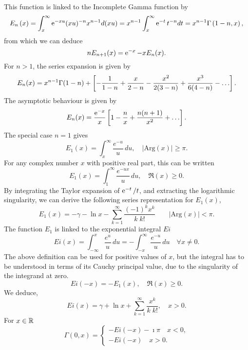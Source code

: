 This function is linked to the Incomplete Gamma function by 
\begin{equation*}
  E_n\left( x \right)=\int_{x}^{\infty}
  \operatorname{e}^{ -xu } (xu)^{-n} x^{n-1} d(xu)=x^{n-1} \int_{x}^{\infty}
  \operatorname{e}^{ -t } t^{-n} dt =  x^{n-1}  \Gamma\left( 1-n, x \right), 
\end{equation*}
from which we can deduce
\begin{equation*}
  n E_{n+1}(x)  =   \operatorname{e}^{ -x } - x E_n(x).
\end{equation*}
For $n>1$, the series expansion is given by
\begin{equation*}
  E_n(x)=x^{n-1}
  \Gamma(1-n)+\recaco{-\frac{1}{1-n}+\frac{x}{2-n}-\frac{x^2}{2(3-n)}
    +\frac{x^3}{6(4-n)}-\dots}.     
\end{equation*}
The asymptotic behaviour is given by
\begin{equation*}
  E_n(x)=\frac{\expp{-x}}{x}\recaco{1-\frac{n}{x}+\frac{n(n+1)}{x^2}+\dots}. 
\end{equation*}
The special case $n=1$ gives 
\begin{equation*}
  E_1(x) = \int_x^\infty \frac{e^{-u}}{u}\, du, \quad |\mathrm{Arg}(x)| \ge \pi. 
\end{equation*}
For any complex number $x$ with positive real part, this can be written
\begin{equation*}
  E_1(x) = \int_1^\infty \frac{e^{-ux}}{u}\, du, \quad \Re(x) \ge 0. 
\end{equation*}
By integrating the Taylor expansion of $\operatorname{e}^{ -t }/t$, and extracting the
logarithmic singularity, we can derive the following series representation for
$E_1(x)$, 
\begin{equation*}
  {E_1}(x) =-\gamma-\ln x-\sum_{k=1}^{\infty}\frac{(-1)^k x^k}{k\; k!}
  \qquad |\mathrm{Arg}(x)| < \pi. 
\end{equation*}
The function $E_1$ is linked to the exponential integral $Ei$
\begin{equation*}
  Ei(x)=\int_{-\infty}^x\frac{e^u}u\, du=-\int_{-x}^{\infty}
  \frac{e^{-u}}{u}\, du \quad \forall x \neq 0. 
\end{equation*}
The above definition  can be used for positive values of $x$, but the integral
has to be understood in terms of its Cauchy principal value, due to the
singularity of the integrand at zero.
\begin{equation*}
  {Ei}(-x) = -{E}_1(x) , \quad \Re(x) \ge 0.
\end{equation*}
We deduce, 
\begin{equation*}
  Ei(x) = \gamma + \ln x+ \sum_{k=1}^{\infty} \frac{x^k}{k\; k!}, \quad x>0.
\end{equation*}
For $x \in {\mathbb R}$ 
\begin{equation*}
  \Gamma(0, x)=\left\{
    \begin{array}{l}
      -Ei(-x)-\imath \pi  \quad  x<0, \\
      -Ei(-x) \quad x>0. 
    \end{array}\right.
\end{equation*}

